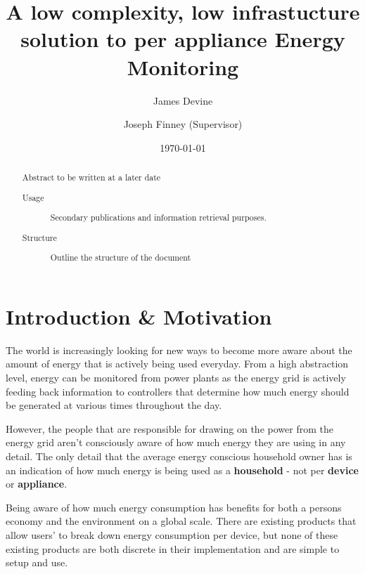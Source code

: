 \documentclass[preprint,12pt,3p]{elsarticle}
\begin{document}
\title{A low complexity, low infrastucture solution to per appliance Energy Monitoring}%

\author{James Devine}
\address{School of Computing and Communications, Lancaster University}
\author{Joseph Finney (Supervisor)}
\address{Infolab21, Lancaster University}

\date{\today}%

\begin{abstract}
Abstract to be written at a later date
\begin{description}
\item[Usage]
Secondary publications and information retrieval purposes.
\item[Structure]
Outline the structure of the document 
\end{description}
\end{abstract}

\maketitle
\clearpage
\tableofcontents
\clearpage
\section{Introduction \& Motivation}

The world is increasingly looking for new ways to become more aware about the amount of energy that is actively being used everyday. From a high abstraction level, energy can be monitored from power plants as the energy grid is actively feeding back information to controllers that determine how much energy should be generated at various times throughout the day.

However, the people that are responsible for drawing on the power from the energy grid aren't consciously aware of how much energy they are using in any detail. The only detail that the average energy conscious household owner has is an indication of how much energy is being used as a \textbf{household} - not per \textbf{device} or \textbf{appliance}.

Being aware of how much energy consumption has benefits for both a persons economy and the environment on a global scale. There are existing products that allow users' to break down energy consumption per device, but none of these existing products are both discrete in their implementation and are simple to setup and use. 
\end{document}
